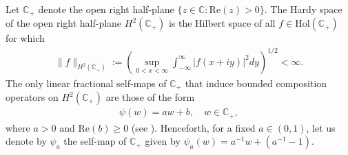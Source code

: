 \documentclass[11pt]{amsart}
\theoremstyle{plain}
\theoremstyle{remark}
\theoremstyle{plain}
\begin{document}
Let $\mathbb{C}_+$ denote the open right half-plane $\{z\in \mathbb{C}:\mathrm{Re}(z)>0\}.$ The Hardy space of the open right half-plane $H^2(\mathbb{C}_+)$ is the Hilbert space of all $f\in \mathrm{Hol}(\mathbb{C}_+)$ for which 
\begin{align*}
\|f\|_{H^2(\mathbb{C}_+)}:= \left( \sup_{0<x<\infty}\int_{-\infty}^{\infty}|f(x+iy)|^2dy\right)^{1/2} < \infty.  
\end{align*}
The only linear fractional self-maps of $\mathbb{C}_+$ that induce bounded composition operators on $H^2(\mathbb{C}_+)$ are those of the form 
 \begin{align}\label{fractional self-map of the right half-plane}
 \psi(w)=aw+b, \quad w\in \mathbb{C}_+,
 \end{align} where $a>0$ and $\mathrm{Re}(b)\geq0$ (see \cite{Elliot-Jury}). Henceforth, for a  fixed $a \in (0,1)$, let us denote by $\psi_a$ the self-map of $\mathbb{C}_+$ given by $\psi_a
(w)=a^{-1}w+(a^{-1}-1).$
 
\end{document}
